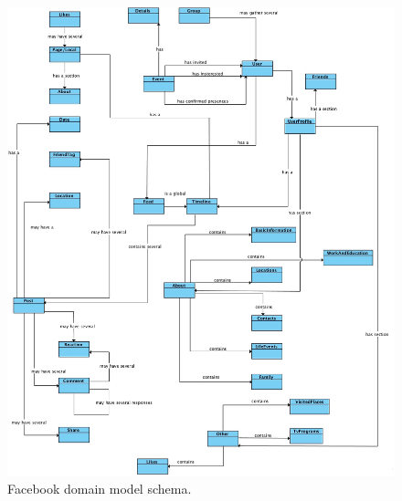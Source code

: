 \begin{figure}[h!]
  \hspace*{-0.5in}
  \includegraphics[width=1.10\textwidth]{img/facebook-domain-model.jpg}
\caption{\label{img:fbdomain} Facebook domain model schema.}
\end{figure}

